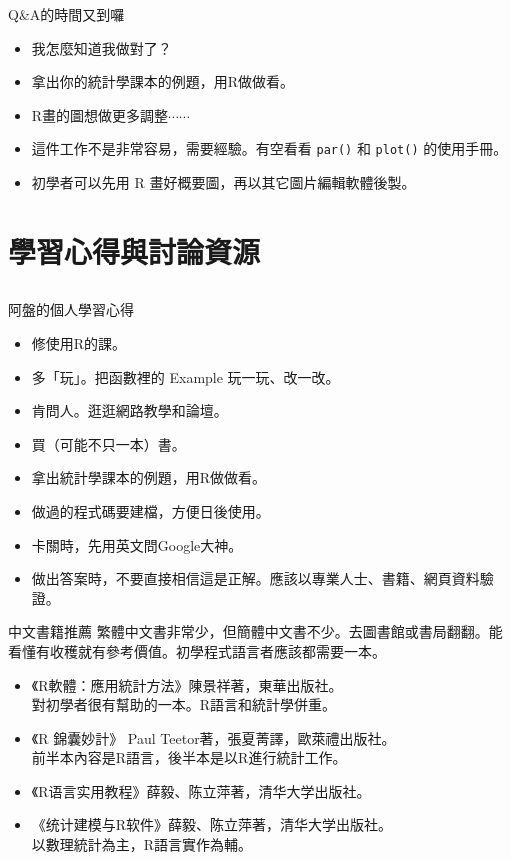 \documentclass[12pt, aspectratio=43]{beamer}
\begin{document}


\begin{frame}[fragile]{Q\&A的時間又到囉}
\begin{itemize}
\item[Q] 我怎麼知道我做對了？
\item[A] 拿出你的統計學課本的例題，用R做做看。
\item[Q] R畫的圖想做更多調整$\cdots\cdots$
\item[A1] 這件工作不是非常容易，需要經驗。有空看看 \verb+par()+ 和 \verb+plot()+ 的使用手冊。
\item[A2] 初學者可以先用 R 畫好概要圖，再以其它圖片編輯軟體後製。
\end{itemize}
\end{frame}



\section{學習心得與討論資源}\subsection{}

\begin{frame}{阿盤的個人學習心得}
\begin{itemize}
\item 修使用R的課。
\item 多「玩」。把函數裡的 Example 玩一玩、改一改。
\item 肯問人。逛逛網路教學和論壇。
\item 買（可能不只一本）書。
\item 拿出統計學課本的例題，用R做做看。
\item 做過的程式碼要建檔，方便日後使用。
\item 卡關時，先用英文問Google大神。
\item 做出答案時，不要直接相信這是正解。應該以專業人士、書籍、網頁資料驗證。
\end{itemize}
\end{frame}


\begin{frame}{中文書籍推薦}
繁體中文書非常少，但簡體中文書不少。去圖書館或書局翻翻。能看懂有收穫就有參考價值。初學程式語言者應該都需要一本。
\begin{itemize}
\item 《R軟體：應用統計方法》陳景祥著，東華出版社。\\ 對初學者很有幫助的一本。R語言和統計學併重。
\item 《R 錦囊妙計》 Paul Teetor著，張夏菁譯，歐萊禮出版社。\\ 前半本內容是R語言，後半本是以R進行統計工作。
\item {《R语言实用教程》薛毅、陈立萍著，清华大学出版社。}
\item {《统计建模与R软件》薛毅、陈立萍著，清华大学出版社。} \\ 以數理統計為主，R語言實作為輔。
\end{itemize}
\end{frame}
\end{document}
